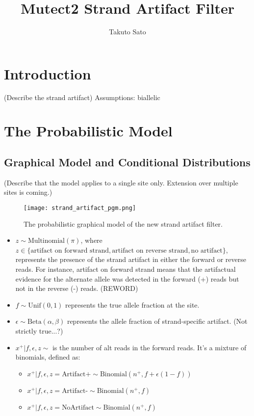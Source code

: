 \documentclass[a4paper]{article}
\title{Mutect2 Strand Artifact Filter}
\author{Takuto Sato}
\begin{document}
\maketitle

\section{Introduction}

(Describe the strand artifact)
Assumptions: 
biallelic

\section{The Probabilistic Model}
\subsection{Graphical Model and Conditional Distributions}

(Describe that the model applies to a single site only. Extension over multiple sites is coming.)

\begin{figure}
\centering
\texttt{[image: strand\_artifact\_pgm.png]}
\caption{\label{fig:frog}The probabilistic graphical model of the new strand artifact filter.}
\end{figure}

\begin{itemize}
	\item $z \sim \text{Multinomial}(\pi)$, where $z  \in \{ \text{artifact on forward strand}, \text{artifact on reverse strand}, \text{no artifact} \}$, represents the presence of the strand artifact in either the forward or reverse reads. For instance, artifact on forward strand means that the artifactual evidence for the alternate allele was detected in the forward (+) reads but not in the reverse (-) reads. (REWORD)
	\item $f \sim \text{Unif}(0, 1)$ represents the true allele fraction at the site.
	\item $\epsilon \sim \text{Beta}(\alpha, \beta)$ represents the allele fraction of strand-specific artifact. (Not strictly true...?)
	\item $x^+ | f, \epsilon, z \sim$ is the number of alt reads in the forward reads. It's a mixture of binomials, defined as:
		\begin{itemize}
			\item $x^+ | f, \epsilon, z = \text{Artifact+} \sim \text{Binomial} (n^+, f + \epsilon(1-f))$
			\item $x^+ | f, \epsilon, z = \text{Artifact-} \sim \text{Binomial} (n^+, f)$
			\item $x^+ | f, \epsilon, z = \text{NoArtifact} \sim \text{Binomial} (n^+, f)$
		\end{itemize}
\end{itemize}
\end{document}
